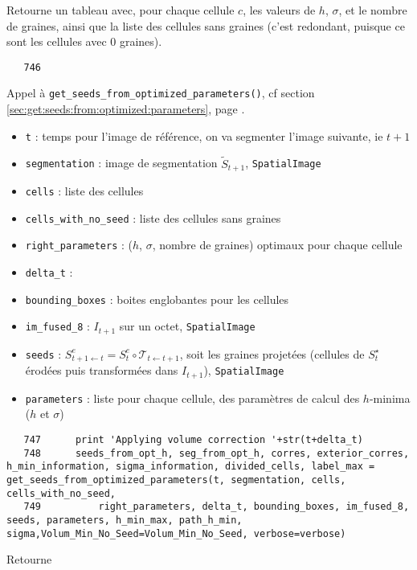 \documentclass{article}
\def \mycolor {red}
\begin{document}
Retourne un tableau avec, pour chaque cellule $c$, les valeurs de $h$, $\sigma$, et le nombre de graines, ainsi que la liste des cellules sans graines (c'est redondant, puisque ce sont les cellules avec 0 graines).
\color{black}
\begin{verbatim}
   746	    
\end{verbatim} 
\color{\mycolor}
Appel \`a \texttt{get\_seeds\_from\_optimized\_parameters()}, cf section \ref{sec:get:seeds:from:optimized:parameters}, page \pageref{sec:get:seeds:from:optimized:parameters}.
\begin{itemize}
\itemsep -0.5ex
\item \verb|t| : temps pour l'image de r\'ef\'erence, on va segmenter l'image suivante, ie $t+1$
\item \verb|segmentation| :  image de segmentation $\tilde{S}_{t+1}$, \texttt{SpatialImage}
\item \verb|cells| : liste des cellules
\item \verb|cells_with_no_seed| : liste des cellules sans graines
\item \verb|right_parameters| : ($h$, $\sigma$, nombre de graines) optimaux pour chaque cellule
\item \verb|delta_t| :
\item \verb|bounding_boxes| : boites englobantes pour les cellules
\item \verb|im_fused_8| : $I_{t+1}$ sur un octet, \texttt{SpatialImage}
\item \verb|seeds| : $S^e_{t+1 \leftarrow t} = S^e_t \circ \mathcal{T}_{t \leftarrow t+1}$, soit les graines projet\'ees (cellules de $S^{\star}_t$ \'erod\'ees puis transform\'ees dans $I_{t+1}$), \texttt{SpatialImage}
\item \verb|parameters| : liste pour chaque cellule,  des param\`etres de calcul des $h$-minima ($h$ et $\sigma$)
\end{itemize}
\color{black}
\begin{verbatim} 
   747	    print 'Applying volume correction '+str(t+delta_t)
   748	    seeds_from_opt_h, seg_from_opt_h, corres, exterior_corres, h_min_information, sigma_information, divided_cells, label_max = get_seeds_from_optimized_parameters(t, segmentation, cells, cells_with_no_seed, 
   749	        right_parameters, delta_t, bounding_boxes, im_fused_8, seeds, parameters, h_min_max, path_h_min, sigma,Volum_Min_No_Seed=Volum_Min_No_Seed, verbose=verbose)
\end{verbatim}
\color{\mycolor}
Retourne
\end{document}
